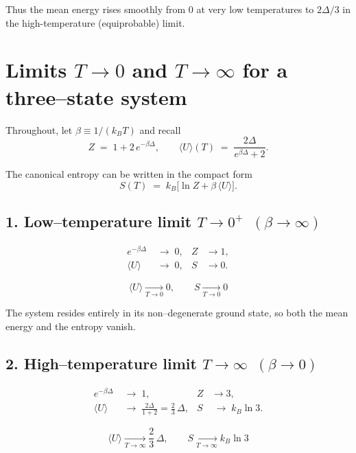 \documentclass[12pt]{article}
\theoremstyle{definition} %
\theoremstyle{plain} %
\begin{document}
Thus the mean energy rises smoothly from \(0\) at very low temperatures to
\(2\Delta/3\) in the high-temperature (equiprobable) limit.
\section*{Limits \(T\!\to\!0\) and \(T\!\to\!\infty\) for a three–state system}

Throughout, let \(\beta \equiv 1/(k_B T)\) and recall  
\[
  Z \;=\; 1 + 2\,e^{-\beta\Delta},
  \qquad
  \langle U\rangle(T)
  \;=\;
  \frac{2\Delta}{e^{\beta\Delta}+2}.
\]

The canonical entropy can be written in the compact form  
\[
  S(T)\;=\;k_B\bigl[\ln Z + \beta\,\langle U\rangle\bigr].
  \tag{1}
\]

\subsection*{1.  Low–temperature limit \(T\to 0^{+}\;\;(\beta\to\infty)\)}

\begin{align}
  e^{-\beta\Delta} &\;\longrightarrow\; 0, & Z &\to 1, \\[4pt]
  \langle U\rangle &\;\to\; 0,            & S  &\to 0.
\end{align}

\[
  \boxed{\;
    \langle U\rangle \xrightarrow[T\to 0]{} 0, 
    \qquad
    S \xrightarrow[T\to 0]{} 0
  \;}
\]

The system resides entirely in its non–degenerate ground state,
so both the mean energy and the entropy vanish.

\subsection*{2.  High–temperature limit \(T\to\infty\;\;(\beta\to 0)\)}

\begin{align}
  e^{-\beta\Delta} &\;\longrightarrow\; 1, &
  Z &\to 3, \\[4pt]
  \langle U\rangle &\;\to\;
     \frac{2\Delta}{1+2}= \frac{2}{3}\,\Delta,
  &
  S &\;\to\;
     k_B\ln 3 .
\end{align}

\[
  \boxed{\;
    \langle U\rangle \xrightarrow[T\to\infty]{} \dfrac{2}{3}\,\Delta,
    \qquad
    S \xrightarrow[T\to\infty]{} k_B\ln 3
  \;}
\]
\end{document}
